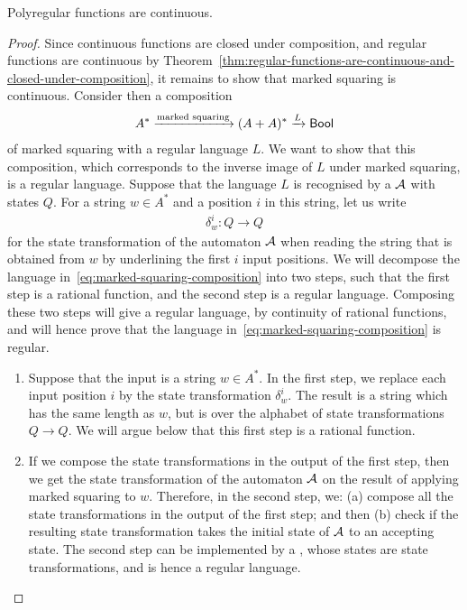 \begin{theorem}\label{thm:polyregular-functions-are-continuous}
    Polyregular functions are continuous.
\end{theorem}
\begin{proof}
    Since continuous functions are closed under composition, and regular functions are continuous by Theorem~\ref{thm:regular-functions-are-continuous-and-closed-under-composition}, it remains to show that marked squaring is continuous. Consider then a composition 
    \begin{align}\label{eq:marked-squaring-composition}
    A^* \xrightarrow{\text{marked squaring}} (A+A)^* \xrightarrow L \mathsf{Bool}
    \end{align}
    of marked squaring with a regular language $L$. We want to show that this composition, which corresponds to the inverse image of $L$ under marked squaring, is a regular language. Suppose that the language $L$ is recognised by a \dfa  ${\mathcal A}$ with states $Q$.     For a string $w  \in A^*$ and a position $i$ in this string, let us write
    \begin{align*}
    \delta_w^i : Q \to Q
    \end{align*}
    for the state transformation of the automaton ${\mathcal A}$ when reading the string that is obtained from $w$ by underlining the first $i$  input positions.  We will decompose the language in~\eqref{eq:marked-squaring-composition} into two steps, such that the first step is a rational function, and the second step is a regular language. Composing these two steps will give a regular language, by continuity of rational functions, and will hence prove that the language in~\eqref{eq:marked-squaring-composition} is regular. 
    \begin{enumerate}
        \item Suppose that the input is a string $w \in A^*$.  In the first step, we replace each input position $i$ by the state transformation $\delta_w^i$. The result is a string which has the same length as $w$, but is over the alphabet of state transformations $Q \to Q$. We will argue below that this first step is a rational function.

        \item If we compose the state transformations in the output of the first step, then we get the state transformation of the automaton ${\mathcal A}$ on the result of applying marked squaring to $w$. Therefore, in the second step, we: (a) compose all the state transformations in the output of the first step; and then  (b) check if the resulting state transformation takes the initial state of ${\mathcal A}$ to an accepting state. The second step can be implemented by a \dfa, whose states are state transformations, and is hence a regular language. 
    \end{enumerate}


\end{proof}
